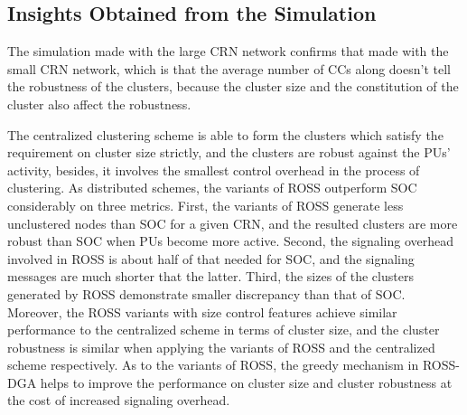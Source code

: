 \documentclass[times]{ettauth}
\theoremstyle{mytheoremstyle}
\theoremstyle{mytheoremstyle}
\theoremstyle{mytheoremstyle}
\begin{document}



\subsection{Insights Obtained from the Simulation}
The simulation made with the large CRN network confirms that made with the small CRN network, which is that the average number of CCs along doesn't tell the robustness of the clusters, because the cluster size and the constitution of the cluster also affect the robustness.

The centralized clustering scheme is able to form the clusters which satisfy the requirement on cluster size strictly, and the clusters are robust against the PUs' activity, besides, it involves the smallest control overhead in the process of clustering.
As distributed schemes, the variants of ROSS outperform SOC considerably on three metrics.
First, the variants of ROSS generate less unclustered nodes than SOC for a given CRN, and the resulted clusters are more robust than SOC when PUs become more active.
Second, the signaling overhead involved in ROSS is about half of that needed for SOC, and the signaling messages are much shorter that the latter.
Third, the sizes of the clusters generated by ROSS demonstrate smaller discrepancy than that of SOC.
Moreover, the ROSS variants with size control features achieve similar performance to the centralized scheme in terms of cluster size, and the cluster robustness is similar when applying the variants of ROSS and the centralized scheme respectively.
%
As to the variants of ROSS, the greedy mechanism in ROSS-DGA helps to improve the performance on cluster size and cluster robustness at the cost of increased signaling overhead.
\end{document}
